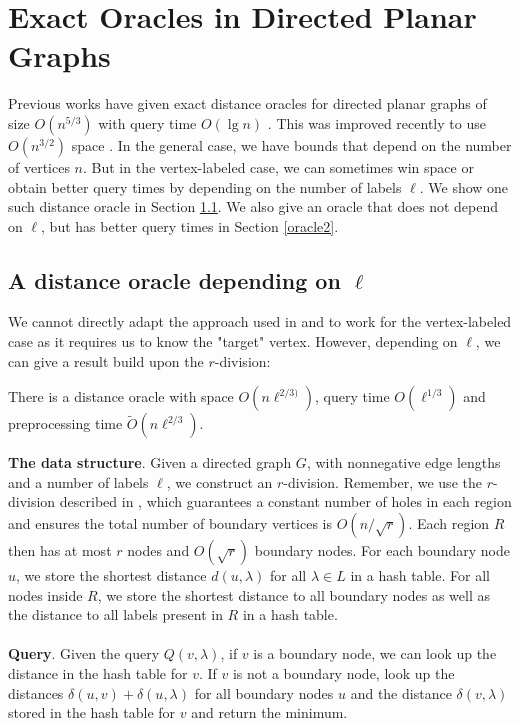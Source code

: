 \section{Exact Oracles in Directed Planar Graphs}\label{exactPlanar}
Previous works have given exact distance oracles for directed planar graphs of size
$O(n^{5/3})$ with query time $O(\lg n)$ \cite{cohen2017fast}. This was improved recently
to use $O(n^{3/2})$ space \cite{gawrychowski2017better}. In the general case, we have
bounds that depend on the number of vertices $n$. But in the vertex-labeled case, we can
sometimes win space or obtain better query times by depending on the number of labels
$\ell$. We show one such distance oracle in Section \ref{oracle1}. We also give an oracle
that does not depend on $\ell$, but has better query times in Section \ref{oracle2}.

\subsection{A distance oracle depending on $\ell$}\label{oracle1}
We cannot directly adapt the approach used in \cite{cohen2017fast} and \cite{gawrychowski2017better} to work
for the vertex-labeled case as it requires us to know the "target" vertex. However,
depending on $\ell$, we can give a result build upon the $r$-division:
\begin{thm}\label{thm1}
  There is a distance oracle with space $O(n\ell^{2/3)})$, query time $O(\ell^{1/3})$ and
  preprocessing time $\tilde{O}(n\ell^{2/3})$.
\end{thm}
\textbf{The data structure}.
Given a directed graph $G$, with nonnegative edge lengths and a number of labels $\ell$, we
construct an $r$-division. Remember, we use the $r$-division described in
\cite{klein2013structured}, which guarantees a constant number of holes in each region
and ensures the total number of boundary vertices is $O(n/\sqrt{r})$. Each region $R$ then has at most $r$ nodes and $O(\sqrt{r})$
boundary nodes. For each boundary node $u$, we store the shortest distance $d(u,\lambda)$
for all $\lambda \in L$ in a hash table. For all nodes inside $R$, we store the shortest
distance to all
boundary nodes as well as the distance to all labels present in $R$ in a hash table. \\
\\
\indent \textbf{Query}.
Given the query $Q(v, \lambda)$, if $v$ is a boundary node, we can look
up the distance in the hash table for $v$. If $v$ is not a boundary node, look up the
distances $\delta(u,v)+\delta(u,\lambda)$ for all boundary nodes $u$ and the distance
$\delta(v,\lambda)$ stored in the hash table for $v$ and return the minimum.

